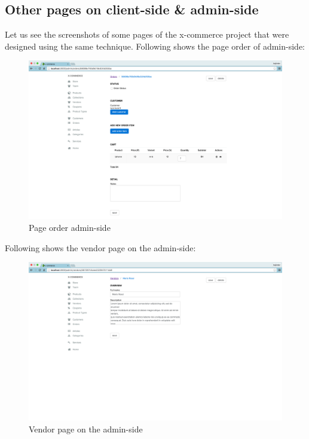 \subsection{Other pages on client-side \& admin-side}
Let us see the screenshots of some pages of the x-commerce project that were designed using the same technique.
\newline
Following shows the page order of admin-side:
\begin{figure}[htb]
\centering
\includegraphics[width=1.0\linewidth]{images/chapter4/page-order-all.png}\hfill
\caption[page order admin-side]{Page order admin-side}
\label{fig:page_order_admin_side}
\end{figure}
\newline
Following shows the vendor page on the admin-side:
\begin{figure}[htb]
\centering
\includegraphics[width=1.0\linewidth]{images/chapter4/page-vendor-all.png}\hfill
\caption[Vendor page on the  admin-side]{Vendor page on the admin-side}
\label{fig:page_vendor_admin_side}
\end{figure}
